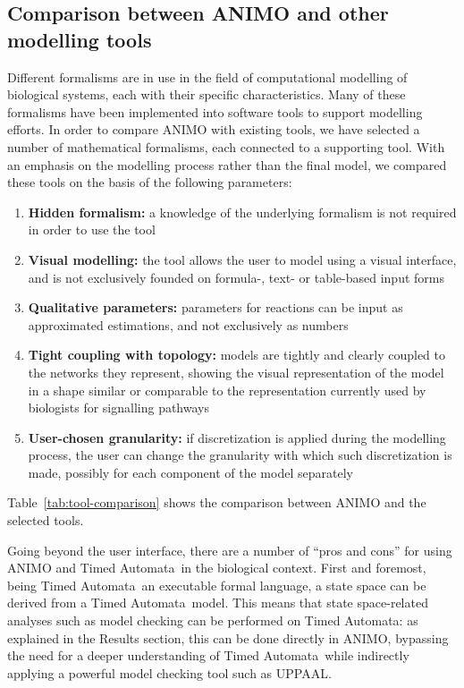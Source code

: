 \documentclass{bmcart}
\def\tas{Timed Automata}
\begin{document}
\subsection*{Comparison between ANIMO and other modelling tools}\label{suppl:comparison-table}
Different formalisms are in use in the field of computational
modelling of biological systems, each with their specific characteristics.
Many of these formalisms have been implemented into
software tools to support modelling efforts. In order to compare
ANIMO with existing tools, we have selected a number of mathematical formalisms,
each connected to a supporting tool. With an emphasis on the modelling
process rather than the final model, we compared these tools on
the basis of the following parameters:

\begin{enumerate}
  \item {\bf Hidden formalism:} a knowledge of the underlying formalism is not required in order to use the tool
  \item {\bf Visual modelling:} the tool allows the user to model using a visual interface, and is not exclusively
      founded on formula-, text- or table-based input forms
  \item {\bf Qualitative parameters:} parameters for reactions can be input as approximated estimations, and not exclusively as numbers
  \item {\bf Tight coupling with topology:} models are tightly and clearly coupled to the networks they represent, showing the visual
      representation of the model in a shape similar or comparable to the representation currently used by biologists
      for signalling pathways
  \item {\bf User-chosen granularity:} if discretization is applied during the modelling process, the user can change the granularity
      with which such discretization is made, possibly for each component of the model separately
\end{enumerate}
Table~\ref{tab:tool-comparison} shows the comparison between ANIMO and the selected tools.

Going beyond the user interface, there are a number of ``pros and cons'' for using ANIMO and \tas\ 
in the biological context. First and foremost, being \tas\ an executable formal language,
a state space can be derived from a \tas\ model. This means that state space-related analyses
such as model checking can be performed on \tas: as explained in the Results section, this can
be done directly in ANIMO, bypassing the need for a deeper understanding of \tas\ while
indirectly applying a powerful model checking tool such as UPPAAL.
\end{document}
